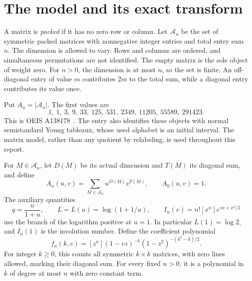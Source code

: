 \section{The model and its exact transform}\label{spm:sec:model}
A matrix is \emph{packed} if it has no zero row or column. Let $\mathcal A_n$ be the set of symmetric packed matrices with nonnegative integer entries and total entry sum $n$. The dimension is allowed to vary. Rows and columns are ordered, and simultaneous permutations are not identified. The empty matrix is the sole object of weight zero. For $n>0$, the dimension is at most $n$, so the set is finite. An off-diagonal entry of value $m$ contributes $2m$ to the total sum, while a diagonal entry contributes its value once.

Put $A_n=|\mathcal A_n|$. The first values are
\[
1,\ 1,\ 3,\ 9,\ 33,\ 125,\ 531,\ 2349,\ 11205,\ 55589,\ 291423.
\]
This is OEIS A138178~\cite{oeis138178}. The entry also identifies these objects with normal semistandard Young tableaux, whose used alphabet is an initial interval. The matrix model, rather than any quotient by relabeling, is used throughout this report.

For $M\in\mathcal A_n$, let $D(M)$ be its actual dimension and $T(M)$ its diagonal sum, and define
\[
 A_n(u,v)=\sum_{M\in\mathcal A_n}u^{D(M)}v^{T(M)},\qquad A_0(u,v)=1.
\]
The auxiliary quantities
\begin{equation}\label{spm:eq:notation}
 q=\frac{u}{1+u},\qquad L=L(u)=\log(1+1/u),\qquad
 I_n(v)=n![x^n]e^{vx+x^2/2}
\end{equation}
use the branch of the logarithm positive at $u=1$. In particular $L(1)=\log2$, and $I_n(1)$ is the involution number. Define the coefficient polynomial
\begin{equation}\label{spm:eq:fn}
 f_n(k,v)=[z^n](1-vz)^{-k}(1-z^2)^{-(k^2-k)/2}.
\end{equation}
For integer $k\geq0$, this counts all symmetric $k\times k$ matrices, with zero lines allowed, marking their diagonal sum. For every fixed $n>0$, it is a polynomial in $k$ of degree at most $n$ with zero constant term.

